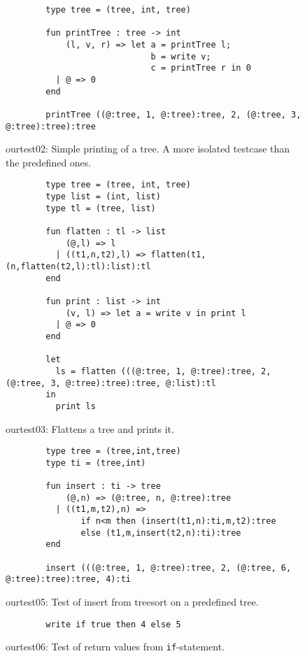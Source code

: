 \begin{figure}
    \centering
    \begin{lstlisting}
        type tree = (tree, int, tree)

        fun printTree : tree -> int
            (l, v, r) => let a = printTree l;
                             b = write v;
                             c = printTree r in 0
          | @ => 0
        end

        printTree ((@:tree, 1, @:tree):tree, 2, (@:tree, 3, @:tree):tree):tree
    \end{lstlisting}
    \label{fig:tests:test02}
    \caption{ourtest02: Simple printing of a tree. A more isolated testcase
             than the predefined ones.}
\end{figure}

\begin{figure}
    \centering
    \begin{lstlisting}
        type tree = (tree, int, tree)
        type list = (int, list)
        type tl = (tree, list)

        fun flatten : tl -> list
            (@,l) => l
          | ((t1,n,t2),l) => flatten(t1,(n,flatten(t2,l):tl):list):tl
        end

        fun print : list -> int
            (v, l) => let a = write v in print l
          | @ => 0
        end

        let
          ls = flatten (((@:tree, 1, @:tree):tree, 2, (@:tree, 3, @:tree):tree):tree, @:list):tl
        in
          print ls
    \end{lstlisting}
    \label{fig:tests:test03}
    \caption{ourtest03: Flattens a tree and prints it.}
\end{figure}

\begin{figure}
    \centering
    \begin{lstlisting}
        type tree = (tree,int,tree)
        type ti = (tree,int)

        fun insert : ti -> tree
            (@,n) => (@:tree, n, @:tree):tree
          | ((t1,m,t2),n) =>
               if n<m then (insert(t1,n):ti,m,t2):tree
               else (t1,m,insert(t2,n):ti):tree
        end

        insert (((@:tree, 1, @:tree):tree, 2, (@:tree, 6, @:tree):tree):tree, 4):ti
    \end{lstlisting}
    \label{fig:tests:test04}
    \caption{ourtest05: Test of insert from treesort on a predefined tree.}
\end{figure}

\begin{figure}
    \centering
    \begin{lstlisting}
        write if true then 4 else 5
    \end{lstlisting}
    \label{fig:tests:test05}
    \caption{ourtest06: Test of return values from \texttt{if}-statement.}
\end{figure}
